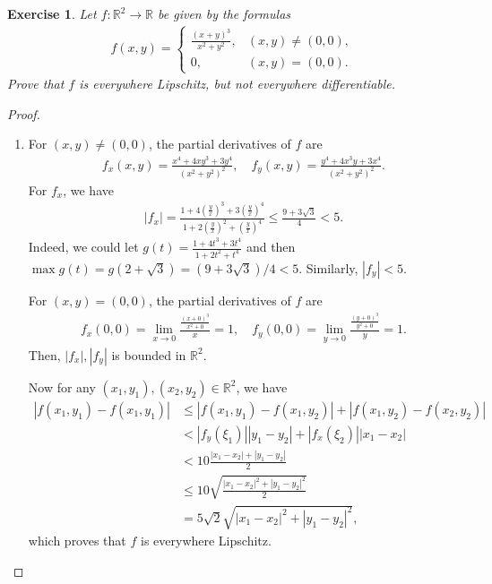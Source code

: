 \documentclass[11pt]{article}
\newtheorem{exercise}{Exercise}[section]
\theoremstyle{definition}
\numberwithin{equation}{subsection}
\begin{document}
\begin{exercise}
Let $f: \mathbb{R}^2 \to \mathbb{R}$ be given by the formulas
\begin{align*}
    f(x,y) = \begin{cases}
        \frac{(x + y)^3}{x^2 + y^2}, & (x,y) \neq (0,0), \\
        0, & (x,y) = (0,0).
    \end{cases}
\end{align*}
Prove that $f$ is everywhere Lipschitz, but not everywhere differentiable.
\end{exercise}
\begin{proof}
~\begin{enumerate}[label=(\alph*)]
    \item For $(x,y) \neq (0,0)$, the partial derivatives of $f$ are
    \begin{align*}
        f_x(x,y) = \frac{x^4 + 4xy^3 + 3y^4}{(x^2 + y^2)^2}, \quad f_y(x,y) = \frac{y^4 + 4x^3y + 3x^4}{(x^2 + y^2)^2}.
    \end{align*}
    For $f_x$, we have
    \begin{align*}
        \left|f_x\right| = \frac{1 + 4\left(\frac{y}{x}\right)^3 + 3\left(\frac{y}{x}\right)^4}{1 + 2\left(\frac{y}{x}\right)^2 + \left(\frac{y}{x}\right)^4} \leq \frac{9 + 3\sqrt{3}}{4} < 5.
    \end{align*}
    Indeed, we could let $g(t) = \frac{1 + 4t^3 + 3t^4}{1 + 2t^2 + t^4}$ and then $\max g(t) = g(2 + \sqrt{3}) = (9 + 3\sqrt{3}) / 4 < 5$. Similarly, $\left|f_y\right| < 5$.
    
    For $(x,y) = (0,0)$, the partial derivatives of $f$ are
    \begin{align*}
        f_x(0,0) = \lim_{x\to 0} \frac{\frac{(x+0)^3}{x^2+0}}{x} = 1, \quad f_y(0,0) = \lim_{y\to 0} \frac{\frac{(y+0)^3}{y^2+0}}{y} = 1.
    \end{align*}
    Then, $\left|f_x\right|, \left|f_y\right|$ is bounded in $\mathbb{R}^2$.
    
    Now for any $(x_1,y_1), (x_2,y_2) \in \mathbb{R}^2$, we have
    \begin{align*}
        \left|f(x_1,y_1) - f(x_1,y_1)\right| & \leq \left|f(x_1,y_1) - f(x_1,y_2)\right| + \left|f(x_1,y_2) - f(x_2,y_2)\right| \\
        & < \left|f_y(\xi_1)\right| \left|y_1 - y_2\right| + \left|f_x(\xi_2)\right| \left|x_1 - x_2\right| \\
        & < 10 \frac{\left|x_1 - x_2\right| + \left|y_1 - y_2\right|}{2} \\
        & \leq 10 \sqrt{\frac{\left|x_1 - x_2\right|^2 + \left|y_1 - y_2\right|^2}{2}} \\
        & = 5\sqrt{2} \sqrt{\left|x_1 - x_2\right|^2 + \left|y_1 - y_2\right|^2},
    \end{align*}
    which proves that $f$ is everywhere Lipschitz.
    

\end{enumerate}
\end{proof}
\end{document}
